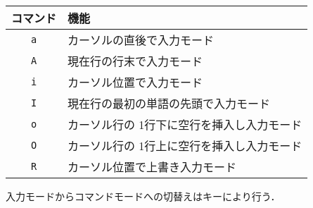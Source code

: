 \begin{center}
\begin{tabular}{c|l}
\hline
{\bf コマンド} & {\bf 機能} \\ \hline
\texttt{a} & カーソルの直後で入力モード \\
\texttt{A} & 現在行の行末で入力モード \\
\texttt{i} & カーソル位置で入力モード \\
\texttt{I} & 現在行の最初の単語の先頭で入力モード \\
\texttt{o} & カーソル行の 1行下に空行を挿入し入力モード \\
\texttt{O} & カーソル行の 1行上に空行を挿入し入力モード \\
\texttt{R} & カーソル位置で上書き入力モード \\
\hline
\end{tabular}
\end{center}

入力モードからコマンドモードへの切替えは\Esckey キーにより行う．

